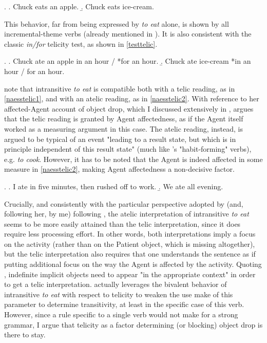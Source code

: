 \ex. \label{tennytelic} \a. \label{tennytelic1} Chuck eats an apple.
\b. \label{tennytelic2} Chuck eats ice-cream.

This behavior, far from being expressed by \textit{to eat} alone, is shown by all incremental-theme verbs (already mentioned in ). It is also consistent with the classic \textit{in/for} telicity test, as shown in \ref{testtelic}.

\ex. \label{testtelic} \a. \label{testtelic1} Chuck ate an apple in an hour / *for an hour.
\b. \label{testtelic2} Chuck ate ice-cream *in an hour / for an hour.

\textcite{Naess2007, Ruda2017, willim2006event, Naess2011} note that intransitive \textit{to eat} is compatible both with a telic reading, as in \ref{naesstelic1}, and with an atelic reading, as in \ref{naesstelic2}. With reference to her affected-Agent account of object drop, which I discussed extensively in , \textcite[78-79]{Naess2007} argues that the telic reading is granted by Agent affectedness, as if the Agent itself worked as a measuring argument in this case. The atelic reading, instead, is argued to be typical of an event "leading to a result state, but which is in principle independent of this result state" (much like \textcite{Vendler1957}'s "habit-forming" verbs), e.g. \textit{to cook}. However, it has to be noted that the Agent is indeed affected in some measure in \ref{naesstelic2}, making Agent affectedness a non-decisive factor.

\ex. \label{naesstelic} \a. \label{naesstelic1} I ate in five minutes, then rushed off to work.
\b. \label{naesstelic2} We ate all evening.

Crucially, and consistently with the particular perspective adopted by \textcite{Medina2007} (and, following her, by me) following \textcite{Olsen1997}, the atelic interpretation of intransitive \textit{to eat} seems to be more easily attained than the telic interpretation, since it does require less processing effort. In other words, both interpretations imply a focus on the activity (rather than on the Patient object, which is missing altogether), but the telic interpretation also requires that one understands the sentence as if putting additional focus on the way the Agent is affected by the activity. Quoting \textcite[4]{OlsenResnik1997}, indefinite implicit objects need to appear "in the appropriate context" in order to get a telic interpretation. \textcite[79]{Naess2007} actually leverages the bivalent behavior of intransitive \textit{to eat} with respect to telicity to weaken the use \textcite{HopperThompson1980} make of this parameter to determine transitivity, at least in the specific case of this verb. However, since a rule specific to a single verb would not make for a strong grammar, I argue that telicity as a factor determining (or blocking) object drop is there to stay.

